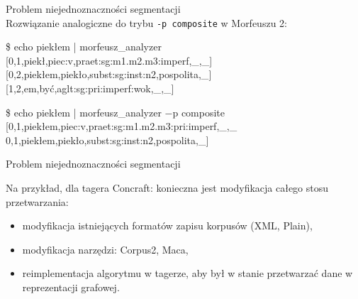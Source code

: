 \documentclass[xcolor=dvipsnames,polish]{beamer}
\begin{document}
\begin{frame}{Problem niejednoznaczności segmentacji}
  \\
  Rozwiązanie analogiczne do trybu \texttt{-p composite} w Morfeuszu 2:
  \vspace{0.5cm}

  \$ echo piekłem | morfeusz\_analyzer\\
  {[}0,1,piekł,piec:v,praet:sg:m1.m2.m3:imperf,\_,\_{]}\\
  {[}0,2,piekłem,piekło,subst:sg:inst:n2,pospolita,\_{]}\\
  {[}1,2,em,być,aglt:sg:pri:imperf:wok,\_,\_{]}\\
  \vspace{0.5cm}

  \$ echo piekłem | morfeusz\_analyzer $-$p composite\\
  {[}0,1,piekłem,piec:v,praet:sg:m1.m2.m3:pri:imperf,\_,\_
  0,1,piekłem,piekło,subst:sg:inst:n2,pospolita,\_{]}
\end{frame}

\begin{frame}{Problem niejednoznaczności segmentacji}
  \vspace{0.5cm}

  Na przykład, dla tagera Concraft: konieczna jest modyfikacja całego stosu przetwarzania:
  \begin{itemize}
    \item modyfikacja istniejących formatów zapisu korpusów (XML, Plain),
    \item modyfikacja narzędzi: Corpus2, Maca,
    \item reimplementacja algorytmu w tagerze, aby był w stanie przetwarzać dane w reprezentacji grafowej.
  \end{itemize}
\end{frame}
\end{document}
